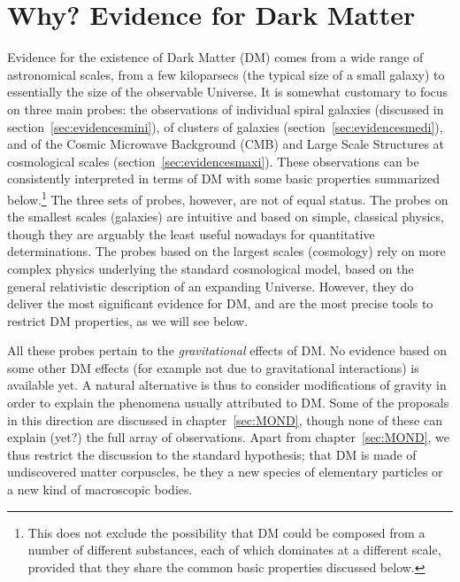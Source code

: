 \chapter{Why? Evidence for Dark Matter}
\label{sec:evidences}
Evidence for the existence of Dark Matter (DM) comes from a  wide range of astronomical scales, from a few kiloparsecs (the typical size of a small galaxy) to essentially the size of the observable Universe. It is somewhat customary to focus on three main probes: the observations of individual spiral galaxies (discussed in section~\ref{sec:evidencesmini}), of clusters of galaxies (section~\ref{sec:evidencesmedi}), and of the Cosmic Microwave Background (CMB) and Large Scale Structures at cosmological scales (section~\ref{sec:evidencesmaxi}). 
These observations can be consistently interpreted in terms of DM with some basic properties summarized below.\footnote{This does not exclude the possibility that DM could be composed from a number of different substances, each of which dominates at a different scale, provided that they share the common basic properties discussed below.
} 
The three sets of probes, however, are not of equal status. 
The probes on the smallest scales (galaxies) are intuitive and based on simple, classical physics, though they are arguably the least useful nowadays for quantitative determinations. The probes based on the largest scales (cosmology) rely on more complex physics underlying the standard cosmological model, based on the general relativistic description of an expanding Universe. However, they do deliver the most significant evidence for DM, and are the most precise tools to restrict DM properties, as we will see below.

\medskip


All these probes pertain to the {\em gravitational} effects of DM. No evidence based on some other DM effects (for example not due to gravitational interactions) is available yet. A natural alternative is thus to consider modifications of gravity in order to explain the phenomena usually attributed to DM. Some of the proposals in this direction are discussed in chapter~\ref{sec:MOND}, though none of these can explain (yet?) the full array of observations. Apart from chapter~\ref{sec:MOND}, we thus restrict the discussion to the standard hypothesis; that DM is made of undiscovered matter corpuscles, be they a new species of elementary particles or a new kind of macroscopic bodies.

\bigskip

